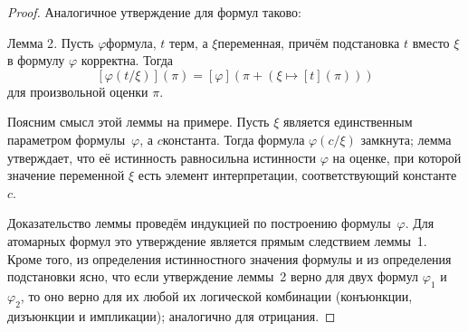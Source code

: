 \begin{proof}
Аналогичное утверждение для формул таково:

\textsf{Лемма 2}. Пусть $\varphi$\т формула, $t$ \т терм, а
        \label{trouble-lemma}%
$\xi$\т переменная, причём подстановка $t$ вместо $\xi$ в
формулу $\varphi$ корректна. Тогда
        $$
   [\varphi(t/\xi)](\pi) = [\varphi](\pi + (\xi\mapsto [t](\pi)))
        $$
для произвольной оценки $\pi$.

Поясним смысл этой леммы на примере. Пусть $\xi$ является
единственным параметром формулы~$\varphi$, а $c$\т константа.
Тогда формула $\varphi(c/\xi)$ замкнута; лемма утверждает, что
её истинность равносильна истинности $\varphi$ на оценке, при
которой значение переменной $\xi$ есть элемент интерпретации,
соответствующий константе~$c$.

Доказательство леммы проведём индукцией по построению
формулы~$\varphi$. Для атомарных формул это утверждение является
прямым следствием леммы~1. Кроме того, из определения
истинностного значения формулы и из определения подстановки
ясно, что если утверждение леммы~2 верно для двух формул
$\varphi_1$ и $\varphi_2$, то оно верно для их любой их
логической комбинации (конъюнкции, дизъюнкции и импликации);
аналогично для отрицания.


\end{proof}
